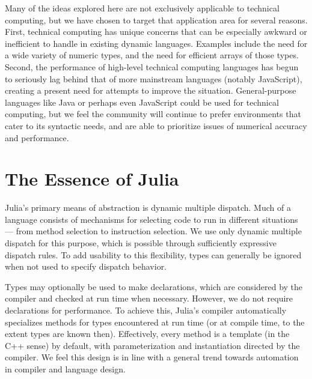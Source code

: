 \documentclass[11pt]{sigplanconf}
\begin{document}
Many of the ideas explored here are not exclusively applicable to technical
computing, but we have chosen to target that application area for several
reasons. First, technical computing has unique concerns that can be
especially awkward or inefficient to handle in existing dynamic languages.
Examples include the need for a wide variety of numeric types, and the need for
efficient arrays of those types. Second, the performance
of high-level technical computing languages has begun to seriously lag behind
that of more mainstream languages (notably JavaScript), creating a present
need for attempts to improve the situation.
General-purpose languages like Java or perhaps even JavaScript could
be used for technical computing, but we feel the community will continue to
prefer environments that cater to its syntactic needs, and are able to
prioritize issues of numerical accuracy and performance.


\section{The Essence of Julia}

Julia's primary means of abstraction is dynamic multiple dispatch.
Much of a language consists of mechanisms for selecting
code to run in different situations --- from method selection to
instruction selection. We use only dynamic multiple dispatch for this
purpose, which is possible through sufficiently expressive
dispatch rules. To add usability to this flexibility,
types can generally be ignored when not used to specify dispatch behavior.

Types may optionally be used to make declarations, which are considered by
the compiler and checked at run time when necessary. However, we do not
require declarations for performance. To achieve this, Julia's compiler
automatically specializes methods for types encountered at run time
(or at compile time, to the extent types are known then). Effectively,
every method is a template (in the C++ sense) by default, with
parameterization and instantiation directed by the compiler. We feel this
design is in line with a general trend towards automation in compiler
and language design.
\end{document}

